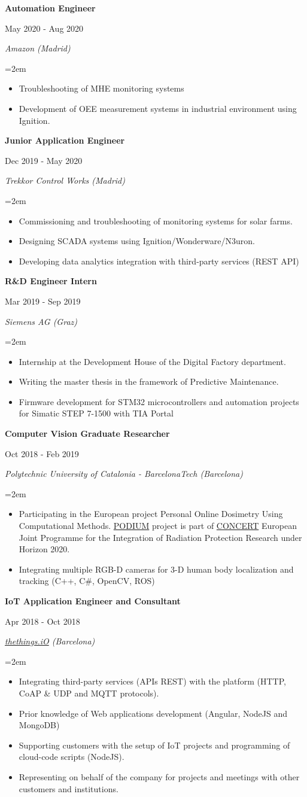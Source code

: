 \documentclass[10pt,a4paper,oneside]{book}
\newcommand{\sepspace}{\vspace*{0pt}}		%
\newcommand{\EducationEntrya}[4]{\noindent\ignorespaces	
		\begin{minipage}[t][][b]{0.8\textwidth} \raggedright{\textbf{#1}} \end{minipage} \hfill 
		\begin{minipage}[t][][b]{0.2\textwidth} \hfill\color{Black}#2\end{minipage} 
		 
		\noindent \textit{#3} \par        %
		\noindent\hangindent=2em\hangafter=0 \small #4 
		\normalsize \par}
\begin{document}
\EducationEntrya{Automation Engineer}{May 2020 - Aug 2020}{Amazon (Madrid)}{\begin{itemize}
    \item Troubleshooting of MHE monitoring systems
    \item Development of OEE measurement systems in industrial environment using Ignition.
\end{itemize}}
\sepspace

\EducationEntrya{Junior Application Engineer}{Dec 2019 - May 2020}{Trekkor Control Works (Madrid)}{\begin{itemize}
\item Commissioning and troubleshooting of monitoring systems for solar farms.
\item Designing SCADA systems using Ignition/Wonderware/N3uron.
\item Developing data analytics integration with third-party services (REST API)
\end{itemize}}
\sepspace

\EducationEntrya{R\&D Engineer Intern}{Mar 2019 - Sep 2019}{Siemens AG (Graz)}{\begin{itemize} 
\item Internship at the Development House of the Digital Factory department. 
\item Writing the master thesis in the framework of Predictive Maintenance.
\item Firmware development for STM32 microcontrollers and automation projects for Simatic STEP 7-1500 with TIA Portal\end{itemize}}
\sepspace

\EducationEntrya{Computer Vision Graduate Researcher}{Oct 2018 - Feb 2019}{Polytechnic University of Catalonia - BarcelonaTech (Barcelona)}{\begin{itemize} 
\item Participating in the European project Personal Online Dosimetry Using Computational Methods. \href{https://podium-concerth2020.eu}{PODIUM} project is part of \href{http://www.concert-h2020.eu/}{CONCERT} European Joint Programme for the Integration of Radiation Protection Research under Horizon 2020.
\item Integrating multiple RGB-D cameras for 3-D human body localization and tracking (C++, C\#, OpenCV, ROS)
\end{itemize}}
\sepspace

\EducationEntrya{IoT Application Engineer and Consultant}{Apr 2018 - Oct 2018}{\href{https://thethings.io/}{thethings.iO} (Barcelona)}{\begin{itemize} 
\item Integrating third-party services (APIs REST) with the platform (HTTP, CoAP \& UDP and MQTT protocols).
\item Prior knowledge of Web applications development (Angular, NodeJS and MongoDB)
\item Supporting customers with the setup of IoT projects and programming of cloud-code scripts (NodeJS).
\item Representing on behalf of the company for projects and meetings with other customers and institutions.
\end{itemize}}
\sepspace
\end{document}
